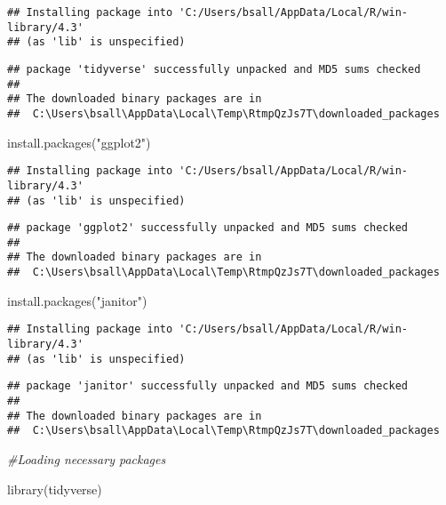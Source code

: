 \documentclass[
]{article}
\newenvironment{Shaded}{\begin{snugshade}}{\end{snugshade}}
\newcommand{\CommentTok}[1]{\textcolor[rgb]{0.56,0.35,0.01}{\textit{#1}}}
\newcommand{\FunctionTok}[1]{\textcolor[rgb]{0.00,0.00,0.00}{#1}}
\newcommand{\NormalTok}[1]{#1}
\newcommand{\StringTok}[1]{\textcolor[rgb]{0.31,0.60,0.02}{#1}}
\begin{document}
\begin{verbatim}
## Installing package into 'C:/Users/bsall/AppData/Local/R/win-library/4.3'
## (as 'lib' is unspecified)
\end{verbatim}

\begin{verbatim}
## package 'tidyverse' successfully unpacked and MD5 sums checked
## 
## The downloaded binary packages are in
##  C:\Users\bsall\AppData\Local\Temp\RtmpQzJs7T\downloaded_packages
\end{verbatim}

\begin{Shaded}
\begin{Highlighting}[]
\FunctionTok{install.packages}\NormalTok{(}\StringTok{"ggplot2"}\NormalTok{)}
\end{Highlighting}
\end{Shaded}

\begin{verbatim}
## Installing package into 'C:/Users/bsall/AppData/Local/R/win-library/4.3'
## (as 'lib' is unspecified)
\end{verbatim}

\begin{verbatim}
## package 'ggplot2' successfully unpacked and MD5 sums checked
## 
## The downloaded binary packages are in
##  C:\Users\bsall\AppData\Local\Temp\RtmpQzJs7T\downloaded_packages
\end{verbatim}

\begin{Shaded}
\begin{Highlighting}[]
\FunctionTok{install.packages}\NormalTok{(}\StringTok{"janitor"}\NormalTok{)}
\end{Highlighting}
\end{Shaded}

\begin{verbatim}
## Installing package into 'C:/Users/bsall/AppData/Local/R/win-library/4.3'
## (as 'lib' is unspecified)
\end{verbatim}

\begin{verbatim}
## package 'janitor' successfully unpacked and MD5 sums checked
## 
## The downloaded binary packages are in
##  C:\Users\bsall\AppData\Local\Temp\RtmpQzJs7T\downloaded_packages
\end{verbatim}

\begin{Shaded}
\begin{Highlighting}[]
\CommentTok{\#Loading necessary packages }

\FunctionTok{library}\NormalTok{(tidyverse)}
\end{Highlighting}
\end{Shaded}
\end{document}
